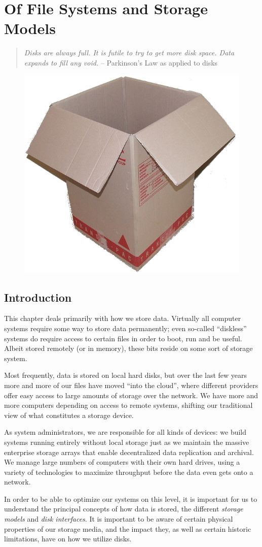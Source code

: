 \chapter{Of File Systems and Storage Models}
\label{chap:file systems}

\begin{quote}
{\em Disks are always full. It is futile to try to get more disk
space. Data expands to fill any void.} --
Parkinson's Law as applied to disks
\end{quote}

\begin{figure}[hb]
	\raggedleft
	\includegraphics[width=.15\textwidth]{04/pics/box}
	\label{fig:storage-box}
\end{figure}


\section{Introduction}
\label{file systems:introduction}

This chapter deals primarily with how we store data.
Virtually all computer systems require some way to
store data permanently; even so-called ``diskless''
systems do require access to certain files in order to
boot, run and be useful.  Albeit stored remotely (or
in memory), these bits reside on some sort of storage
system.

Most frequently, data is stored on local hard disks,
but over the last few years more and more of our files
have moved ``into the cloud'', where different
providers offer easy access to large amounts of
storage over the network.  We have more and more
computers depending on access to remote systems,
shifting our traditional view of what constitutes a
storage device.

As system administrators, we are responsible for all
kinds of devices: we build systems running entirely
without local storage just as we maintain the massive
enterprise storage arrays that enable decentralized
data replication and archival.  We manage large
numbers of computers with their own hard drives, using
a variety of technologies to maximize throughput
before the data even gets onto a network.

In order to be able to optimize our systems on this
level, it is important for us to understand the
principal concepts of how data is stored, the
different {\em storage models} and {\em disk
interfaces}.  It is important to be aware of certain
physical properties of our storage media, and the
impact they, as well as certain historic limitations,
have on how we utilize disks.

